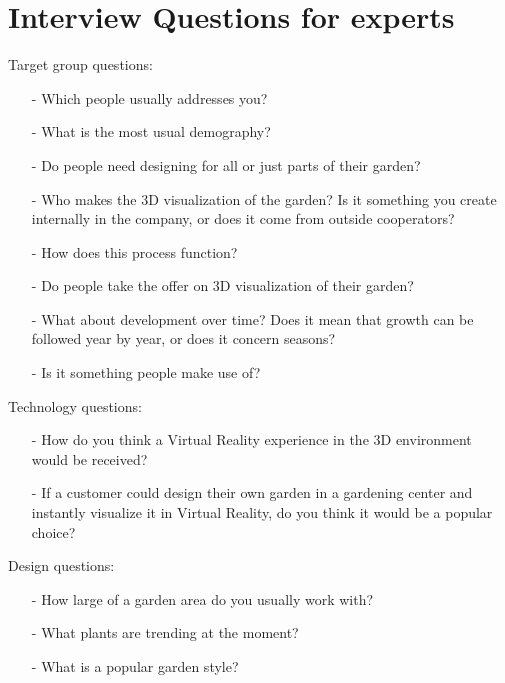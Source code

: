 \section*{Interview Questions for experts}\label{sec:interviewQuestionsExperts}

Target group questions:
\begin{itemize}
	\item[-] Which people usually addresses you?
	\item[-] What is the most usual demography?
	\item[-] Do people need designing for all or just parts of their garden?
	\item[-] Who makes the 3D visualization of the garden? Is it something you create internally in the company, or does it come from outside cooperators? 
	\item[-] How does this process function?
	\item[-] Do people take the offer on 3D visualization of their garden?
	\item[-] What about development over time? Does it mean that growth can be followed year by year, or does it concern seasons?
	\item[-] Is it something people make use of? \\
\end{itemize}

Technology questions:
\begin{itemize}
	\item[-] How do you think a Virtual Reality experience in the 3D environment would be received?
	\item[-] If a customer could design their own garden in a gardening center and instantly visualize it in Virtual Reality, do you think it would be a popular choice? \\
\end{itemize}

Design questions:
\begin{itemize}
	\item[-] How large of a garden area do you usually work with?
	\item[-] What plants are trending at the moment?
	\item[-] What is a popular garden style?
\end{itemize}